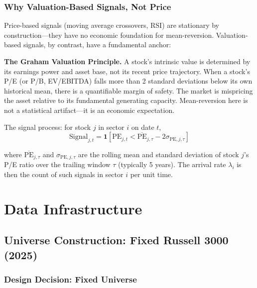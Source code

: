 \documentclass[11pt, oneside]{book}
\begin{document}
\section{Why Valuation-Based Signals, Not Price}

Price-based signals (moving average crossovers, RSI) are stationary by construction---they have no economic foundation for mean-reversion. Valuation-based signals, by contrast, have a fundamental anchor:

\begin{institutionbox}
\textbf{The Graham Valuation Principle.} A stock's intrinsic value is determined by its earnings power and asset base, not its recent price trajectory. When a stock's P/E (or P/B, EV/EBITDA) falls more than 2 standard deviations below its own historical mean, there is a quantifiable margin of safety. The market is mispricing the asset relative to its fundamental generating capacity. Mean-reversion here is not a statistical artifact---it is an economic expectation.
\end{institutionbox}

The signal process: for stock $j$ in sector $i$ on date $t$,
\begin{equation}
    \text{Signal}_{j,t} = \mathbf{1}\!\left[\text{PE}_{j,t} < \overline{\text{PE}}_{j,\tau} - 2\sigma_{\text{PE},j,\tau}\right]
\end{equation}

where $\overline{\text{PE}}_{j,\tau}$ and $\sigma_{\text{PE},j,\tau}$ are the rolling mean and standard deviation of stock $j$'s P/E ratio over the trailing window $\tau$ (typically 5 years). The arrival rate $\lambda_i$ is then the count of such signals in sector $i$ per unit time.

\part{Data Infrastructure}

\chapter{Universe Construction: Fixed Russell 3000 (2025)}

\section{Design Decision: Fixed Universe}
\end{document}
